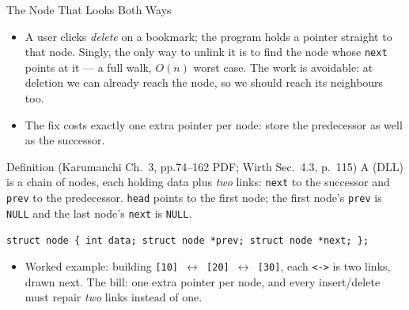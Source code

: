 \documentclass[aspectratio=169]{beamer}
\begin{document}
\begin{frame}{The Node That Looks Both Ways}
  \begin{itemize}
    \item A user clicks \emph{delete} on a bookmark; the program holds a
      pointer straight to that node. Singly, the only way to unlink it is to
      find the node whose \texttt{next} points at it --- a full walk,
      $O(n)$ worst case. The work is avoidable: at deletion we can already
      reach the node, so we should reach its neighbours too.
    \item The fix costs exactly one extra pointer per node: store the
      predecessor as well as the successor.
  \end{itemize}
  \begin{block}{Definition (Karumanchi Ch.~3, pp.74--162 PDF; Wirth
    Sec.~4.3, p.~115)
    \cite{Karumanchi2017_data_structures_algorithms_made_easy,Wirth2004_algorithms_data_structures}}
    A  (DLL) is a chain of nodes, each holding data
    plus \emph{two} links: \texttt{next} to the successor and \texttt{prev} to
    the predecessor. \texttt{head} points to the first node; the first node's
    \texttt{prev} is \texttt{NULL} and the last node's \texttt{next} is
    \texttt{NULL}.
  \end{block}
\begin{center}
{\small \texttt{struct node \{ int data; struct node *prev; struct node
  *next; \};}}
\end{center}
  \begin{itemize}
    \item Worked example: building \texttt{[10] $\leftrightarrow$ [20]
      $\leftrightarrow$ [30]}, each \texttt{<->} is two links, drawn next.
      The bill: one extra pointer per node, and every insert/delete must
      repair \emph{two} links instead of one.
  \end{itemize}
\end{frame}
\end{document}
